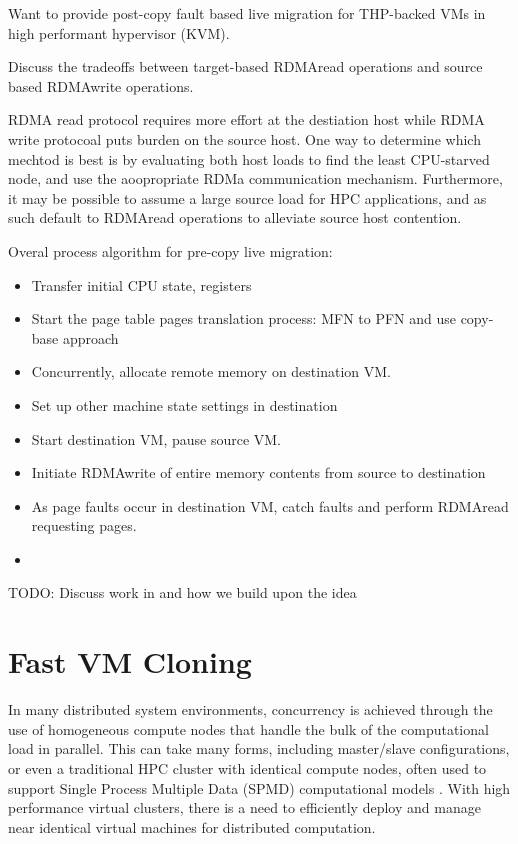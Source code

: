 Want to provide post-copy fault based live migration for THP-backed VMs in high performant hypervisor (KVM). 

Discuss the tradeoffs between target-based RDMAread operations and source based RDMAwrite operations.

RDMA read protocol requires more effort at the destiation host while RDMA write protocoal puts burden on the source host.  One way to determine which mechtod is best is by evaluating both host loads to find the least CPU-starved node, and use the aoopropriate RDMa communication mechanism. Furthermore, it may be possible to assume a large source load for HPC applications, and as such default to RDMAread operations to alleviate source host contention. 

Overal process algorithm for pre-copy live migration:
\begin{itemize}
\item Transfer initial CPU state, registers
\item Start the page table pages translation process: MFN to PFN and use copy-base approach
\item Concurrently, allocate remote memory on destination VM.
\item Set up other machine state settings in destination
\item Start destination VM, pause source VM.
\item Initiate RDMAwrite of entire memory contents from source to destination
\item As page faults occur in destination VM, catch faults and perform RDMAread requesting pages. 
\item 

\end{itemize}


TODO: Discuss work in \cite{huang2007high} and how we build upon the idea


\section{Fast VM Cloning}

In many distributed system environments, concurrency is achieved through the use of homogeneous compute nodes that handle the bulk of the computational load in parallel. This can take many forms, including master/slave configurations, or even a traditional HPC cluster with identical compute nodes, often used to support Single Process Multiple Data (SPMD) computational models \cite{spmd1988}. With high performance virtual clusters, there is a need to efficiently deploy and manage near identical virtual machines for distributed computation. 

